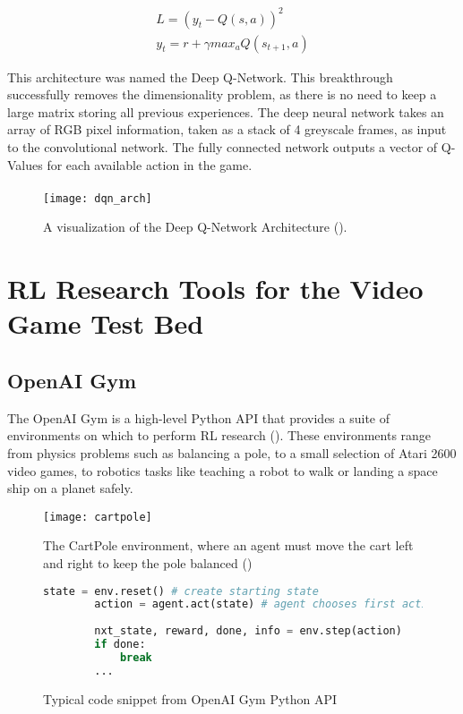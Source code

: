 \begin{align}
    L = (y_t - Q(s, a))^2 \label{equ:DQLoss} \\
    y_t = r + \gamma max_{a}Q(s_{t+1}, a) \label{equ:DQTarget}
\end{align}

This architecture was named the Deep Q-Network. This breakthrough successfully removes the dimensionality problem, as there is no need to keep a large matrix storing all previous experiences. The deep neural network takes an array of RGB pixel information, taken as a stack of 4 greyscale frames, as input to the convolutional network. The fully connected network outputs a vector of Q-Values for each available action in the game. \paragraph{}

\begin{figure}[H]
    \centering
    \texttt{[image: dqn\_arch]}
    \caption{A visualization of the Deep Q-Network Architecture (\citet{human}).}
\end{figure}

\section{RL Research Tools for the Video Game Test Bed}
\subsection{OpenAI Gym}
The OpenAI Gym is a high-level Python API that provides a suite of environments on which to perform RL research (\citet{openaigym}). These environments range from physics problems such as balancing a pole, to a small selection of Atari 2600 video games, to robotics tasks like teaching a robot to walk or landing a space ship on a planet safely.

\begin{figure}[H]
    \centering
    \texttt{[image: cartpole]}
    \caption{The CartPole environment, where an agent must move the cart left and right to keep the pole balanced (\citet{openaigym})}
\end{figure}

\begin{figure}[h]
    \centering
    \begin{lstlisting}[language=Python]
        state = env.reset() # create starting state
        action = agent.act(state) # agent chooses first action
        
        nxt_state, reward, done, info = env.step(action)
        if done:
            break
        ...
    \end{lstlisting}
    \caption{Typical code snippet from OpenAI Gym Python API}
\end{figure}

